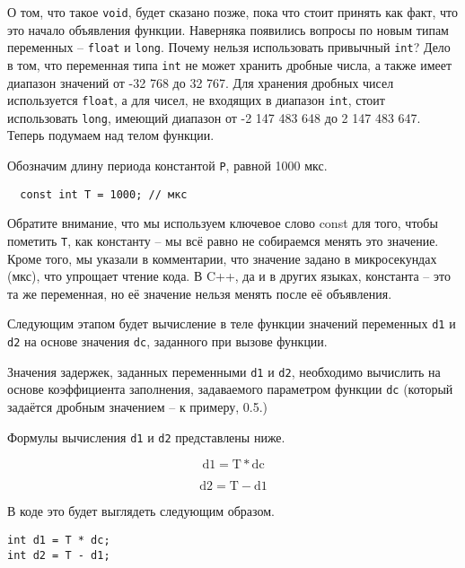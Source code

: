 \documentclass[../sparc.tex]{subfiles}
\begin{document}
О том, что такое \texttt{void}, будет сказано позже, пока что стоит принять как
факт, что это начало объявления функции. Наверняка появились вопросы по новым
типам переменных -- \texttt{float} и \texttt{long}. Почему нельзя использовать
привычный \texttt{int}? Дело в том, что переменная типа \texttt{int} не может
хранить дробные числа, а также имеет диапазон значений от -32 768 до 32 767. Для
хранения дробных чисел используется \texttt{float}, а для чисел, не входящих в
диапазон \texttt{int}, стоит использовать \texttt{long}, имеющий диапазон от -2
147 483 648 до 2 147 483 647. Теперь подумаем над телом функции.

Обозначим длину периода константой \texttt{P}, равной 1000 мкс.

\begin{verbatim}
  const int T = 1000; // мкс
\end{verbatim}

Обратите внимание, что мы используем ключевое слово const для того, чтобы
пометить \texttt{T}, как константу -- мы всё равно не собираемся менять это
значение.  Кроме того, мы указали в комментарии, что значение задано в
микросекундах (мкс), что упрощает чтение кода.  В C++, да и в других языках,
константа -- это та же переменная, но её значение нельзя менять после её
объявления.

Следующим этапом будет вычисление в теле функции значений переменных \texttt{d1}
и \texttt{d2} на основе значения \texttt{dc}, заданного при вызове функции.

Значения задержек, заданных переменными \texttt{d1} и \texttt{d2}, необходимо
вычислить на основе коэффициента заполнения, задаваемого параметром функции
\texttt{dc} (который задаётся дробным значением -- к примеру, 0.5.)

Формулы вычисления \texttt{d1} и \texttt{d2} представлены ниже.

\begin{equation}
  \mbox{d1} = \mbox{T} * \mbox{dc}
  \label{Формула вычисления времени подачи сигнала ``HIGH''}
\end{equation}

\begin{equation}
  \mbox{d2} = \mbox{T} - \mbox{d1}
  \label{Формула вычисления времени подачи сигнала ``LOW''}
\end{equation}

В коде это будет выглядеть следующим образом.

\begin{verbatim}
int d1 = T * dc;
int d2 = T - d1;
\end{verbatim}
\end{document}

